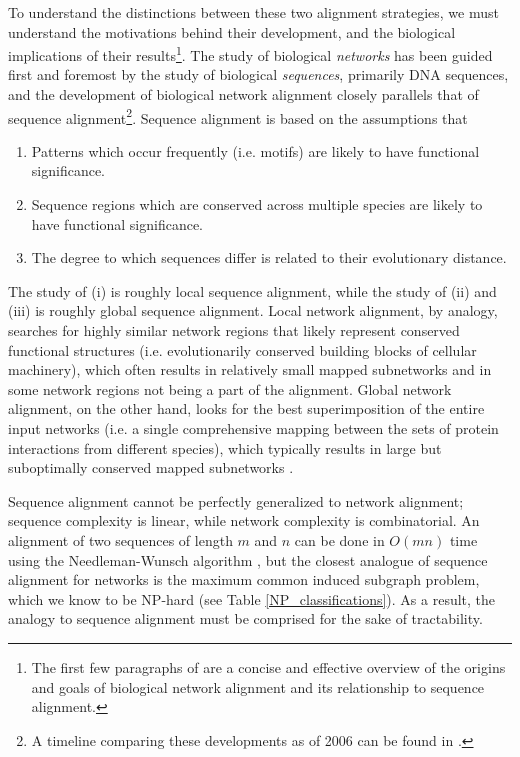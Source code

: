 \documentclass[12pt]{thesis}
\theoremstyle{plain}
\theoremstyle{definition}
\theoremstyle{remark}
\begin{document}
To understand the distinctions between these two alignment strategies, we must understand the motivations behind their development, and the biological implications of their results\footnote{The first few paragraphs of \cite{flannick2006graemlin} are a concise and effective overview of the origins and goals of biological network alignment and its relationship to sequence alignment.}. The study of biological \textit{networks} has been guided first and foremost by the study of biological \textit{sequences}, primarily DNA sequences, and the development of biological network alignment closely parallels that of sequence alignment\footnote{A timeline comparing these developments as of 2006 can be found in \cite{Sharan_2006}.}. Sequence alignment is based on the assumptions that 

\begin{enumerate}
\item Patterns which occur frequently (i.e. motifs) are likely to have functional significance. 
\item Sequence regions which are conserved across multiple species are likely to have functional significance.
\item The degree to which sequences differ is related to their evolutionary distance.
\end{enumerate}

The study of (i) is roughly local sequence alignment, while the study of (ii) and (iii) is roughly global sequence alignment. Local network alignment, by analogy, searches for highly similar network regions that likely represent conserved functional structures (i.e. evolutionarily conserved building blocks of cellular machinery), which often results in relatively small mapped subnetworks and in some network regions not being a part of the alignment. Global network alignment, on the other hand, looks for the best superimposition of the entire input networks  (i.e. a single comprehensive mapping between the sets of protein interactions from different species), which typically results in large but suboptimally conserved mapped subnetworks \cite{guzzi2017survey}.

Sequence alignment cannot be perfectly generalized to network alignment; sequence complexity is linear, while network complexity is combinatorial. An alignment of two sequences of length $m$ and $n$ can be done in $O(mn)$ time using the Needleman-Wunsch algorithm \cite{Wunsch_time_is_over}, but the closest analogue of sequence alignment for networks is the maximum common induced subgraph problem, which we know to be NP-hard (see Table \ref{NP_classifications}). As a result, the analogy to sequence alignment must be comprised for the sake of tractability.
\end{document}
